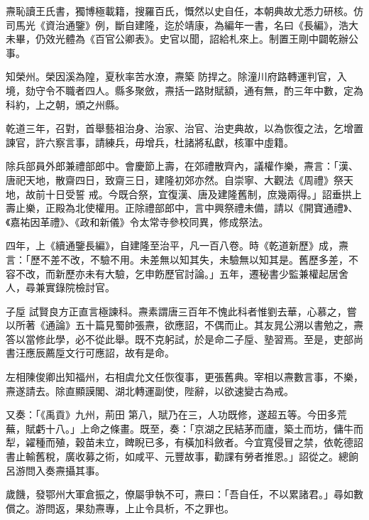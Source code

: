 \begin{pinyinscope}
 燾恥讀王氏書，獨博極載籍，搜羅百氏，慨然以史自任，本朝典故尤悉力研核。仿司馬光《資治通鑒》例，斷自建隆，迄於靖康，為編年一書，名曰《長編》，浩大未畢，仍效光體為《百官公卿表》。史官以聞，詔給札來上。制置王剛中闢乾辦公事。



 知榮州。榮因溪為隍，夏秋率苦水潦，燾築
 防捍之。除潼川府路轉運判官，入境，劾守令不職者四人。縣多聚斂，燾括一路財賦額，通有無，酌三年中數，定為科約，上之朝，頒之州縣。



 乾道三年，召對，首舉藝祖治身、治家、治官、治吏典故，以為恢復之法，乞增置諫官，許六察言事，請練兵，毋增兵，杜諸將私獻，核軍中虛籍。



 除兵部員外郎兼禮部郎中。會慶節上壽，在郊禮散齊內，議權作樂，燾言：「漢、唐祀天地，散齋四日，致齋三日，建隆初郊亦然。自崇寧、大觀法《周禮》祭天地，故前十日受誓
 戒。今既合祭，宜復漢、唐及建隆舊制，庶幾兩得。」詔垂拱上壽止樂，正殿為北使權用。正除禮部郎中，言中興祭禮未備，請以《開寶通禮》、《嘉祐因革禮》、《政和新儀》令太常寺參校同異，修成祭法。



 四年，上《續通鑒長編》，自建隆至治平，凡一百八卷。時《乾道新歷》成，燾言：「歷不差不改，不驗不用。未差無以知其失，未驗無以知其是。舊歷多差，不容不改，而新歷亦未有大驗，乞申飭歷官討論。」五年，遷秘書少監兼權起居舍人，尋兼實錄院檢討官。



 子垕
 試賢良方正直言極諫科。燾素謂唐三百年不愧此科者惟劉去華，心慕之，嘗以所著《通論》五十篇見蜀帥張燾，欲應詔，不偶而止。其友晁公溯以書勉之，燾答以當修此學，必不從此舉。既不克躬試，於是命二子垕、塾習焉。至是，吏部尚書汪應辰薦垕文行可應詔，故有是命。



 左相陳俊卿出知福州，右相虞允文任恢復事，更張舊典。宰相以燾數言事，不樂，燾遂請去。除直顯謨閣、湖北轉運副使，陛辭，以欲速變古為戒。



 又奏：「《禹貢》九州，荊田
 第八，賦乃在三，人功既修，遂超五等。今田多荒蕪，賦虧十八。」上命之條畫。既至，奏：「京湖之民結茅而廬，築土而坊，傭牛而犁，糴種而殖，穀苗未立，睥睨已多，有橫加科斂者。今宜寬侵冒之禁，依乾德詔書止輸舊稅，廣收募之術，如咸平、元豐故事，勸課有勞者推恩。」詔從之。總餉呂游問入奏燾攝其事。



 歲饑，發鄂州大軍倉振之，僚屬爭執不可，燾曰：「吾自任，不以累諸君。」尋如數償之。游問返，果劾燾專，上止令具析，不之罪也。




\end{pinyinscope}
